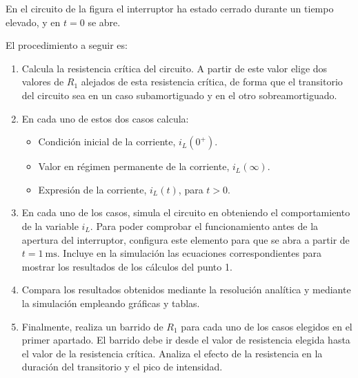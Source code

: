 \documentclass[a4paper,10pt]{article} %
\begin{document}

\vspace{1cm}


En el circuito de la figura el interruptor ha estado cerrado durante
un tiempo elevado, y en $t = 0$ se abre. 

El procedimiento a seguir es:

\begin{enumerate}
\item Calcula la resistencia crítica del circuito. A partir de este
  valor elige dos valores de $R_1$ alejados de esta resistencia
  crítica, de forma que el transitorio del circuito sea en un caso
  subamortiguado y en el otro sobreamortiguado.

\item En cada uno de estos dos casos calcula:
  \begin{itemize}
  \item Condición inicial de la corriente, $i_L(0^+)$.
  \item Valor en régimen permanente de la corriente, $i_L(\infty)$.
  \item Expresión de la corriente, $i_L(t)$, para $t > 0$.
  \end{itemize}
\item En cada uno de los casos, simula el circuito en {\qucs}
  obteniendo el comportamiento de la variable $i_L$. Para poder
  comprobar el funcionamiento antes de la apertura del interruptor,
  configura este elemento para que se abra a partir de
  $t = \qty{1}{\milli\second}$. Incluye en la simulación las
  ecuaciones correspondientes para mostrar los resultados de los
  cálculos del punto 1.
\item Compara los resultados obtenidos mediante la resolución
  analítica y mediante la simulación empleando gráficas y tablas.
\item Finalmente, realiza un barrido de $R_1$ para cada uno de los
  casos elegidos en el primer apartado. El barrido debe ir desde el
  valor de resistencia elegida hasta el valor de la resistencia
  crítica. Analiza el efecto de la resistencia en la duración del
  transitorio y el pico de intensidad.
\end{enumerate}
\end{document}
